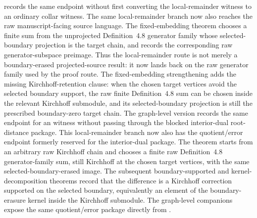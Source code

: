 \documentclass[11pt]{article}
\begin{document}
records the same endpoint without first converting the local-remainder witness
to an ordinary collar witness.
The same local-remainder branch now also reaches the raw manuscript-facing
source language.  The fixed-embedding theorem
chooses a finite sum from the unprojected Definition~4.8 generator family whose
selected-boundary projection is the target chain, and
records the corresponding raw generator-subspace preimage.  Thus the
local-remainder route is not merely a boundary-erased projected-source result:
it now lands back on the raw generator family used by the proof route.
The fixed-embedding strengthening
adds the missing Kirchhoff-retention clause: when the chosen target vertices
avoid the selected boundary support, the raw finite Definition~4.8 sum can be
chosen inside the relevant Kirchhoff submodule, and its selected-boundary
projection is still the prescribed boundary-zero target chain.  The graph-level
version records the same endpoint for an
witness without passing through the blocked interior-dual root-distance package.
This local-remainder branch now also has the quotient/error endpoint formerly
reserved for the interior-dual package.  The theorem
starts from an arbitrary raw Kirchhoff chain and chooses a finite raw
Definition~4.8 generator-family sum, still Kirchhoff at the chosen target
vertices, with the same selected-boundary-erased image.  The subsequent
boundary-supported and kernel-decomposition theorems record that the difference
is a Kirchhoff correction supported on the selected boundary, equivalently an
element of the boundary-erasure kernel inside the Kirchhoff submodule.  The
graph-level companions expose the same quotient/error package directly from
.
\end{document}
